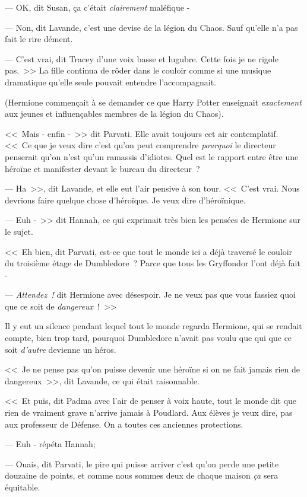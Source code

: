 --- OK, dit Susan, ça c'était \emph{clairement} maléfique -

--- Non, dit Lavande, c'est une devise de la légion du Chaos. Sauf qu'elle n'a pas fait le rire dément.

--- C'est vrai, dit Tracey d'une voix basse et lugubre. Cette fois je ne rigole pas.~>> La fille continua de rôder dans le couloir comme si une musique dramatique qu'elle seule pouvait entendre l'accompagnait.

(Hermione commençait à se demander ce que Harry Potter enseignait \emph{exactement} aux jeunes et influençables membres de la légion du Chaos).

<<~Mais - enfin -~>> dit Parvati. Elle avait toujours cet air contemplatif. <<~Ce que je veux dire c'est qu'on peut comprendre \emph{pourquoi} le directeur penserait qu'on n'est qu'un ramassis d'idiotes. Quel est le rapport entre être une héroïne et manifester devant le bureau du directeur~?

--- Ha~>>, dit Lavande, et elle eut l'air pensive à son tour. <<~C'est vrai. Nous devrions faire quelque chose d'héroïque. Je veux dire d'héroïnique.

--- Euh -~>> dit Hannah, ce qui exprimait très bien les pensées de Hermione sur le sujet.

<<~Eh bien, dit Parvati, est-ce que tout le monde ici a déjà traversé le couloir du troisième étage de Dumbledore~? Parce que tous les Gryffondor l'ont déjà fait -

--- \emph{Attendez~!} dit Hermione avec désespoir. Je ne veux pas que vous fassiez quoi que ce soit de \emph{dangereux}~!~>>

Il y eut un silence pendant lequel tout le monde regarda Hermione, qui se rendait compte, bien trop tard, pourquoi Dumbledore n'avait pas voulu que qui que ce soit \emph{d'autre} devienne un héros.

<<~Je ne pense pas qu'on puisse devenir une héroïne si on ne fait jamais rien de dangereux~>>, dit Lavande, ce qui était raisonnable.

<<~Et puis, dit Padma avec l'air de penser à voix haute, tout le monde dit que rien de vraiment grave n'arrive jamais à Poudlard. Aux élèves je veux dire, pas aux professeur de Défense. On a toutes ces anciennes protections.

--- Euh - répéta Hannah;

--- Ouais, dit Parvati, le pire qui puisse arriver c'est qu'on perde une petite douzaine de points, et comme nous sommes deux de chaque maison \emph{ça} sera équitable.

